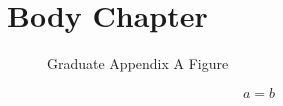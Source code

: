 \documentclass[degree=master, academic=true, fontset=fandol]{nwputhesis}
\begin{document}
\START
\showoutput

\frontmatter
\mainmatter
\chapter{Body Chapter}

\begin{thesisappendix}
\makeatletter
{}
\makeatother
\begin{figure}[htbp]
    \caption{Graduate Appendix A Figure}
\end{figure}
\end{thesisappendix}

\begin{thesisappendix}
\makeatletter
{}
\makeatother
\begin{equation}
    a=b
\end{equation}
\begin{algorithm}[htbp]
    \caption{Graduate Appendix B Algorithm}
\end{algorithm}
\end{thesisappendix}

\clearpage
\OMIT
\end{document}
